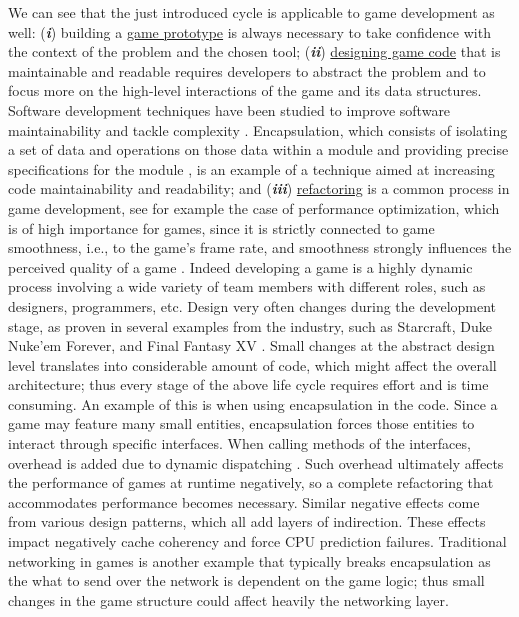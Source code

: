 We can see that the just introduced cycle is applicable to game development as well: (\textit{\textbf{i}}) building a \underline{game prototype} is always necessary to take confidence with the context of the problem and the chosen tool; (\textit{\textbf{ii}}) \underline{designing game code} that is maintainable and readable requires developers to abstract the problem and to focus more on the high-level interactions of the game and its data structures. Software development techniques have been studied to improve software maintainability and tackle complexity \cite{collar2006role}. Encapsulation, which consists of isolating a set of data and operations on those data within a module and providing precise specifications for the module \cite{citeulike:10949855}, is an example of a technique aimed at increasing code maintainability and readability; and (\textit{\textbf{iii}}) \underline{refactoring} is a common process in game development, see for example the case of performance optimization, which is of high importance for games, since it is strictly connected to game smoothness, i.e., to the game's frame rate, and smoothness strongly influences the perceived quality of a game \cite{claypool2009perspectives}. Indeed developing a game is a highly dynamic process \cite{takeuchi1986new} involving a wide variety of team members with different roles, such as designers, programmers, etc. Design very often changes during the development stage, as proven in several examples from the industry, such as Starcraft, Duke Nuke'em Forever, and Final Fantasy XV \cite{variety_article}. Small changes at the abstract design level translates into considerable amount of code, which might affect the overall architecture; thus every stage of the above life cycle requires effort and is time consuming. An example of this is when using encapsulation \cite{zhou2008partial} in the code. Since a game may feature many small entities, encapsulation forces those entities to interact through specific interfaces. When calling methods of the interfaces, overhead is added due to dynamic dispatching \cite{zhou2008partial}. Such overhead ultimately affects the performance of games at runtime negatively, so a complete refactoring that accommodates performance becomes necessary. Similar negative effects come from various design patterns, which all add layers of indirection. These effects impact negatively cache coherency and force CPU prediction failures. Traditional networking in games is another example that typically breaks encapsulation as the what to send over the network is dependent on the game logic; thus small changes in the game structure could affect heavily the networking layer.


